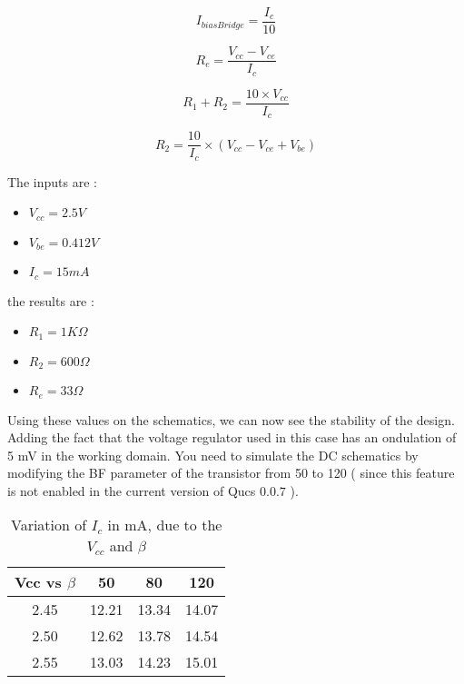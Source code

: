 \begin{equation}
I_{biasBridge} = \frac{I_c}{10}
\end{equation}

\begin{equation}
R_e = \frac{V_{cc} - V_{ce}}{I_c}
\end{equation}


\begin{equation}
R_1 + R_2 = \frac{10 \times V_{cc}}{I_c}
\end{equation}

\begin{equation}
R_2 = \frac{10}{I_c} \times ( V_{cc} - V_{ce} + V_{be} )
\end{equation}


The inputs are :
\begin{itemize}
\item $V_{cc} = 2.5 V$
\item $V_{be} = 0.412 V$
\item $I_c = 15 mA$
\end{itemize}

the results are :
\begin{itemize}
\item $R_1 = 1 K\Omega$
\item $R_2 = 600 \Omega$
\item $R_e = 33 \Omega$
\end{itemize}

Using these values on the schematics, we can now see the stability of the design. Adding the fact that the voltage regulator used in this case has an ondulation of 5 mV in the working domain.  You need to simulate the DC schematics by modifying the BF parameter of the transistor from 50 to 120 ( since this feature is not enabled in the current version of Qucs $0.0.7$ ).


\begin{table}[htp]
\caption{Variation of $I_c$ in mA, due to the $V_{cc}$ and $\beta$}
\begin{center}
\begin{tabular}{|c|c|c|c|} \hline
Vcc  vs $\beta$ & 50 & 80 & 120 \\ \hline
2.45	&	12.21	&	13.34	&	14.07	\\
2.50	&	12.62	&	13.78	&	14.54	\\
2.55 	&	13.03	&	14.23	&	15.01	\\ \hline
\end{tabular}
\end{center}
\label{design:pa:bias:variation}
\end{table}

